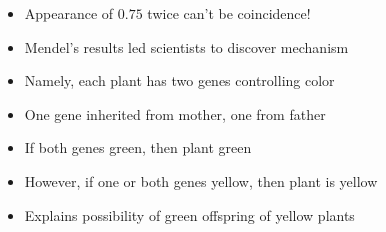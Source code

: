 \documentclass{beamer}
\theoremstyle{definition}
\begin{document}
\begin{frame}
\begin{itemize}
\item Appearance of $0.75$ twice can't be coincidence!
\item Mendel's results led scientists to discover mechanism
\item Namely, each plant has two \alert{genes} controlling color
\item One gene inherited from mother, one from father
\item If both genes green, then plant green
\item However, if one or both genes yellow, then plant is yellow
\item Explains possibility of green offspring of yellow plants
\end{itemize}
\end{frame}
\end{document}
